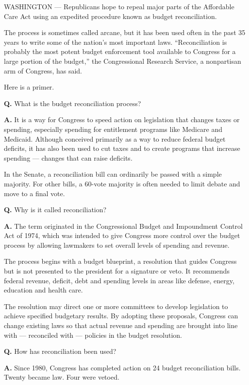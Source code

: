 WASHINGTON --- Republicans hope to repeal major parts of the Affordable
Care Act using an expedited procedure known as budget reconciliation.

The process is sometimes called arcane, but it has been used often in
the past 35 years to write some of the nation's most important laws.
``Reconciliation is probably the most potent budget enforcement tool
available to Congress for a large portion of the budget,'' the
Congressional Research Service, a nonpartisan arm of Congress, has said.

Here is a primer.

\textbf{Q.} What is the budget reconciliation process?

\textbf{A.} It is a way for Congress to speed action on legislation that
changes taxes or spending, especially spending for entitlement programs
like Medicare and Medicaid. Although conceived primarily as a way to
reduce federal budget deficits, it has also been used to cut taxes and
to create programs that increase spending --- changes that can raise
deficits.

In the Senate, a reconciliation bill can ordinarily be passed with a
simple majority. For other bills, a 60-vote majority is often needed to
limit debate and move to a final vote.

\textbf{Q.} Why is it called reconciliation?

\textbf{A.} The term originated in the Congressional Budget and
Impoundment Control Act of 1974, which was intended to give Congress
more control over the budget process by allowing lawmakers to set
overall levels of spending and revenue.

The process begins with a budget blueprint, a resolution that guides
Congress but is not presented to the president for a signature or veto.
It recommends federal revenue, deficit, debt and spending levels in
areas like defense, energy, education and health care.

The resolution may direct one or more committees to develop legislation
to achieve specified budgetary results. By adopting these proposals,
Congress can change existing laws so that actual revenue and spending
are brought into line with --- reconciled with --- policies in the
budget resolution.

\textbf{Q.} How has reconciliation been used?

\textbf{A.} Since 1980, Congress has completed action on 24 budget
reconciliation bills. Twenty became law. Four were vetoed.

